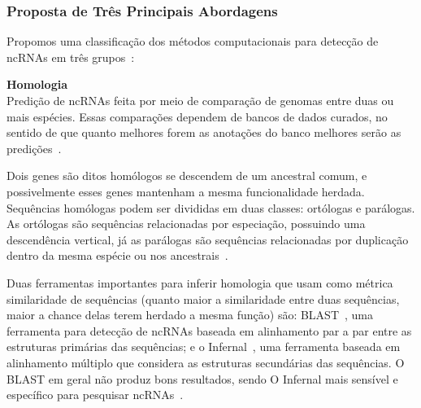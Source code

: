 

\subsubsection{Proposta de Três Principais Abordagens}

Propomos uma classificação dos métodos computacionais para detecção de ncRNAs em três grupos~\citep{griffiths2007annotating:2007,Stadler:2011}:


\textbf{Homologia} \\


Predição de ncRNAs feita por meio de comparação de genomas entre duas ou mais espécies. Essas comparações dependem de bancos de dados curados, no sentido de que quanto melhores forem as anotações do banco melhores serão as predições~\citep{machado2008computational:2008}.

Dois genes são ditos homólogos se descendem de um ancestral comum, e possivelmente esses genes mantenham a mesma funcionalidade herdada. Sequências homólogas podem ser divididas em duas classes: ortólogas e parálogas. As ortólogas são sequências relacionadas por especiação, possuindo uma descendência vertical, já as parálogas são sequências relacionadas por duplicação dentro da mesma espécie ou nos ancestrais~\citep{stryer:2002}.




Duas ferramentas importantes para inferir homologia que usam como métrica similaridade de sequências (quanto maior a similaridade entre duas sequências, maior a chance delas terem herdado a mesma função) são: BLAST~\citep{altschul1990basic:1990}, uma ferramenta para detecção de ncRNAs baseada em alinhamento par a par  entre as estruturas primárias das sequências; e o Infernal~\citep{altschul1990basic:1990}, uma ferramenta baseada em alinhamento múltiplo que considera as estruturas secundárias das sequências. O BLAST em geral não produz bons resultados, sendo O Infernal mais sensível e específico para pesquisar ncRNAs~\citep{eddy2003infernal:2003}.\\



